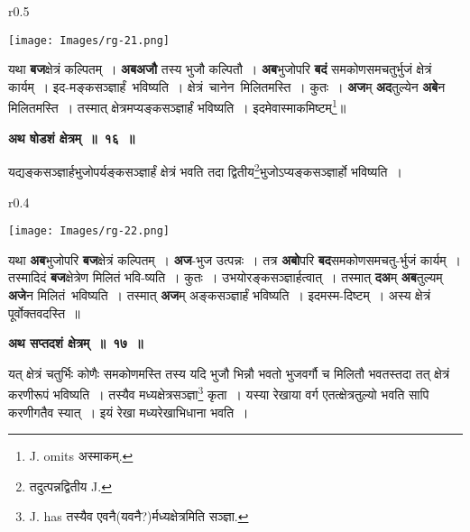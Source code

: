 \documentclass[11pt, openany]{book}
\begin{document}
\begin{wrapfigure}{r}{0.5\textwidth}
\vspace{-4mm}
\begin{center}
\texttt{[image: Images/rg-21.png]}
\end{center}
\vspace{-8mm}
\end{wrapfigure}

 यथा \textbf{बज}क्षेत्रं कल्पितम्~। \textbf{अबअजौ} तस्य भुजौ कल्पितौ~। \textbf{अब}भुजोपरि \textbf{बदं} समकोणसमचतुर्भुजं क्षेत्रं कार्यम्~। इद-मङ्कसञ्ज्ञार्हं \,भविष्यति~। क्षेत्रं \,चानेन \,मिलितमस्ति~। कुतः~। \textbf{अज}म् \textbf{अद}तुल्येन \textbf{अबे}न मिलितमस्ति~। तस्मात् क्षेत्रमप्यङ्कसञ्ज्ञार्हं भविष्यति~। इदमेवास्माकमिष्टम्\renewcommand{\thefootnote}{१}\footnote{{\en J. omits} अस्माकम्.}\;॥ 
\vspace{2mm}
 
\begin{center}
\textbf{\large अथ षोडशं क्षेत्रम्~॥~१६~॥}
\end{center}

{\ab  यद्यङ्कसञ्ज्ञार्हभुजोपर्यङ्कसञ्ज्ञार्हं क्षेत्रं भवति तदा द्वितीय\renewcommand{\thefootnote}{२}\footnote{तदुत्पन्नद्वितीय {\en J.}}भुजोऽप्यङ्कसञ्ज्ञार्हो भविष्यति~। }\\

\begin{wrapfigure}{r}{0.4\textwidth}
\vspace{-4mm}
\begin{center}
\texttt{[image: Images/rg-22.png]}
\end{center}
\vspace{-8mm}
\end{wrapfigure}

 यथा \textbf{अब}भुजोपरि \textbf{बज}क्षेत्रं कल्पितम्~। \textbf{अज}-भुज उत्पन्नः~। तत्र \textbf{अबो}परि \textbf{बद}समकोणसमचतु-र्भुजं कार्यम्~। तस्मादिदं \textbf{बज}क्षेत्रेण मिलितं भवि-ष्यति~। कुतः~। उभयोरङ्कसञ्ज्ञार्हत्वात्~। तस्मात् \textbf{दअ}म् \;\textbf{अब}तुल्यम् \,\textbf{अजे}न \;मिलितं \,भविष्यति~। तस्मात् \textbf{अज}म् अङ्कसञ्ज्ञार्हं भविष्यति~। इदमस्म-दिष्टम्~। अस्य क्षेत्रं पूर्वोक्तवदस्ति~॥
\vspace{2mm}
 
\begin{center}
\textbf{\large अथ सप्तदशं क्षेत्रम्~॥~१७~॥} 
\end{center}

{\ab  यत् क्षेत्रं चतुर्भिः कोणैः समकोणमस्ति तस्य यदि भुजौ भिन्नौ भवतो भुजवर्गौ च मिलितौ भवतस्तदा तत् क्षेत्रं करणीरूपं भविष्यति~। तस्यैव मध्यक्षेत्रसञ्ज्ञा\renewcommand{\thefootnote}{३}\footnote{{\en J. has} तस्यैव एवनै(यवनै?)र्मध्यक्षेत्रमिति सञ्ज्ञा.} कृता~। यस्या रेखाया वर्ग एतत्क्षेत्रतुल्यो भवति सापि करणीगतैव स्यात्~। इयं रेखा मध्यरेखाभिधाना भवति~। }
\end{document}
